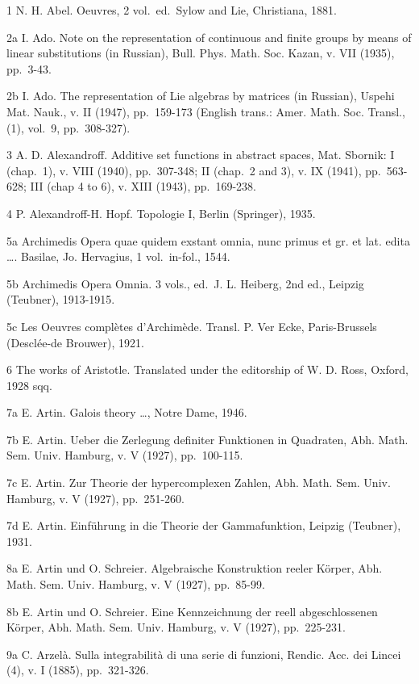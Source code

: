
1 N. H. Abel. Oeuvres, 2 vol.~ed.~Sylow and Lie, Christiana, 1881.

2a I. Ado. Note on the representation of continuous and finite groups by means of linear substitutions (in Russian), Bull. Phys. Math. Soc. Kazan, v. VII (1935), pp.~3-43.

2b I. Ado. The representation of Lie algebras by matrices (in Russian), Uspehi Mat. Nauk., v. II (1947), pp.~159-173 (English trans.: Amer. Math. Soc. Transl., (1), vol.~9, pp.~308-327).

3 A. D. Alexandroff. Additive set functions in abstract spaces, Mat. Sbornik: I (chap.~1), v. VIII (1940), pp.~307-348; II (chap.~2 and 3), v. IX (1941), pp.~563-628; III (chap 4 to 6), v. XIII (1943), pp.~169-238.

4 P. Alexandroff-H. Hopf. Topologie I, Berlin (Springer), 1935.

5a Archimedis Opera quae quidem exstant omnia, nunc primus et gr. et lat. edita \ldots. Basilae, Jo. Hervagius, 1 vol.~in-fol., 1544.

5b Archimedis Opera Omnia. 3 vols., ed.~J. L. Heiberg, 2nd ed., Leipzig (Teubner), 1913-1915.

5c Les Oeuvres complètes d'Archimède. Transl. P. Ver Ecke, Paris-Brussels (Desclée-de Brouwer), 1921.

6 The works of Aristotle. Translated under the editorship of W. D. Ross, Oxford, 1928 sqq.

7a E. Artin. Galois theory \ldots, Notre Dame, 1946.

7b E. Artin. Ueber die Zerlegung definiter Funktionen in Quadraten, Abh. Math. Sem. Univ. Hamburg, v. V (1927), pp.~100-115.

7c E. Artin. Zur Theorie der hypercomplexen Zahlen, Abh. Math. Sem. Univ. Hamburg, v. V (1927), pp.~251-260.

7d E. Artin. Einführung in die Theorie der Gammafunktion, Leipzig (Teubner), 1931.

8a E. Artin und O. Schreier. Algebraische Konstruktion reeler Körper, Abh. Math. Sem. Univ. Hamburg, v. V (1927), pp.~85-99.

8b E. Artin und O. Schreier. Eine Kennzeichnung der reell abgeschlossenen Körper, Abh. Math. Sem. Univ. Hamburg, v. V (1927), pp.~225-231.

9a C. Arzelà. Sulla integrabilità di una serie di funzioni, Rendic. Acc. dei Lincei (4), v. I (1885), pp.~321-326.

